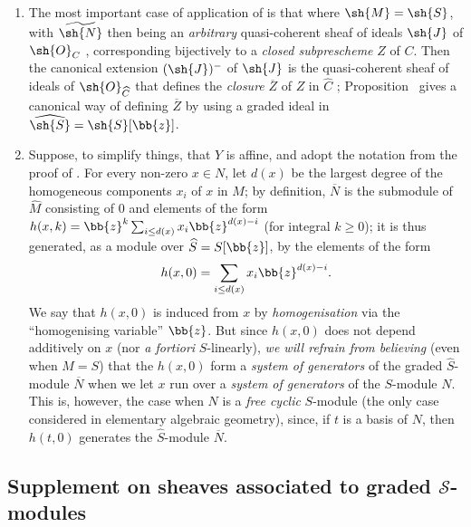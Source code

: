 \begin{remark}[8.13.4]
\label{II.8.13.4}
\begin{enumerate}
    \item[\rm{(i)}] The most important case of application of  is that where $\sh{M}=\sh{S}$, with $\widetilde{\sh{N}}$ then being an \emph{arbitrary} quasi-coherent sheaf of ideals $\sh{J}$ of $\sh{O}_C$ , corresponding bijectively to a \emph{closed subprescheme} $Z$ of $C$.
        Then the canonical extension $(\sh{J})^-$ of $\sh{J}$ is the quasi-coherent sheaf of ideals of $\sh{O}_{\widehat{C}}$ that defines the \emph{closure} $\overline{Z}$ of $Z$ in $\widehat{C}$ ;
        Proposition~ gives a canonical way of defining $\overline{Z}$ by using a graded ideal in $\widehat{\sh{S}}=\sh{S}[\bb{z}]$.
    \item[\rm{(ii)}] Suppose, to simplify things, that $Y$ is affine, and adopt the notation from the proof of .
        For every non-zero $x\in N$, let $d(x)$ be the largest degree of the homogeneous components $x_i$ of $x$ in $M$;
        by definition, $\overline{N}$ is the submodule of $\widehat{M}$ consisting of $0$ and elements of the form $h(x,k)=\bb{z}^k\sum_{i\leq d(x)}x_i\bb{z}^{d(x)-i}$ (for integral $k\geq0$);
        it is thus generated, as a module over $\widehat{S}=S[\bb{z}]$, by the elements of the form
        \[
            h(x,0) = \sum_{i\leq d(x)}x_i\bb{z}^{d(x)-i}.
        \]
        We say that $h(x,0)$ is induced from $x$ by \emph{homogenisation} via the ``homogenising variable'' $\bb{z}$.
        But since $h(x,0)$ does not depend additively on $x$ (nor \emph{a fortiori} $S$-linearly), \emph{we will refrain from believing} (even when $M=S$) that the $h(x,0)$ form a \emph{system of generators} of the graded $\widehat{S}$-module $\overline{N}$ when we let $x$ run over a \emph{system of generators} of the $S$-module $N$.
        This is, however, the case when $N$ is a \emph{free cyclic} $S$-module (the only case considered in elementary algebraic geometry), since, if $t$ is a basis of $N$, then $h(t,0)$ generates the $\widehat{S}$-module $\overline{N}$.
\end{enumerate}
\end{remark}


\subsection{Supplement on sheaves associated to graded $\mathcal{S}$-modules}
\label{subsection:II.8.14}

